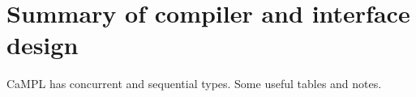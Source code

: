 \documentclass[acmsmall]{acmart}
\begin{document}
%
%
%


\iffalse
\section{Summary of compiler and interface design}

CaMPL has concurrent and sequential types. Some useful tables and notes.
\end{document}
